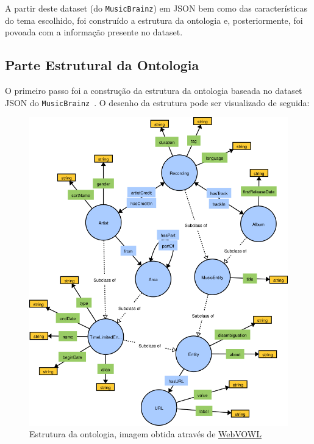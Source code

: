 \documentclass{article}
\begin{document}
A partir deste dataset (do \texttt{MusicBrainz}) em JSON bem como das características do tema escolhido, foi construído a estrutura da ontologia e, posteriormente, foi povoada com a informação presente no dataset.

\subsection{Parte Estrutural da Ontologia} \label{ontoStruct}

O primeiro passo foi a construção da estrutura da ontologia baseada no dataset JSON do \texttt{MusicBrainz}~\cite{mbSchema}. O desenho da estrutura pode ser visualizado de seguida:

\begin{figure}[H]
    \centering
    \includegraphics[width=12cm]{Pictures/ontologySctructure.png}
    \caption{Estrutura da ontologia, imagem obtida através de \protect\href{http://www.visualdataweb.de/webvowl/}{WebVOWL}}
\end{figure}
\end{document}
